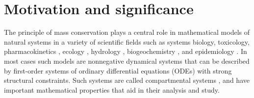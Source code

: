%
%

%


%
%
%
%


\section{Motivation and significance}
The principle of mass conservation plays a central role in mathematical models
of natural systems in a variety of scientific fields such as systems biology,
toxicology, pharmacokinetics \citep{Anderson1983}, ecology
\citep{Eriksson1971ARoEaS, Rodhe1979Tellus, Matis1979, Manzoni2009SBB},
hydrology \citep{Nash1957IASH, Botter2011GRL, Harman2014GRL}, biogeochemistry
\citep{Manzoni2009SBB, Sierra2015EM}, and epidemiology \citep{Jacquez1993SIAM}.
In most cases such models are nonnegative dynamical systems that can be
described by first-order systems of ordinary differential equations (ODEs) with
strong structural constraints.  Such systems are called compartmental systems
\citep{Anderson1983, Jacquez1993SIAM, Walter1999, Haddad2010}, and have
important mathematical properties that aid in their analysis and study.

